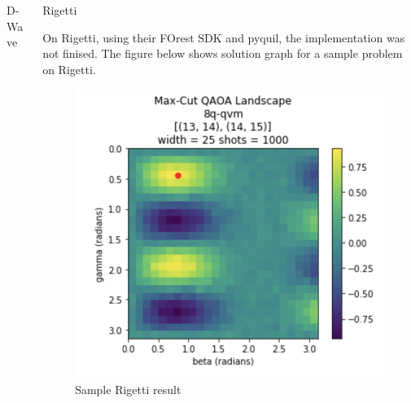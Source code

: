 \documentclass[final]{beamer}
\newlength{\onecolwid}
\newlength{\twocolwid}
\begin{document}
\begin{frame}[t]
\begin{columns}[t]
\begin{column}{\twocolwid}
\begin{columns}[t,totalwidth=\twocolwid]
\begin{column}{\onecolwid}
\begin{block}{D-Wave}
\end{block}


\end{column} %

\begin{column}{\onecolwid} %


\begin{block}{Rigetti}


On Rigetti, using their FOrest SDK and pyquil, the implementation was not finised. The figure below shows solution graph for a sample problem on Rigetti.
\begin{figure}
\includegraphics[width=0.8\linewidth]{rigettisampler.png}
\caption{Sample Rigetti result}
\end{figure}

\end{block}



\end{column} %

\end{columns} %


\end{column}
\end{columns}
\end{frame}
\end{document}
